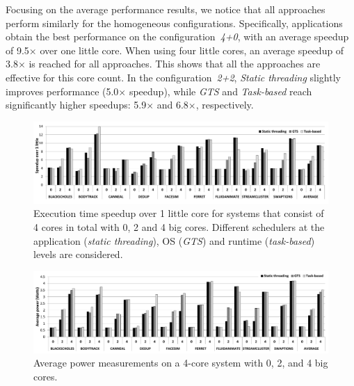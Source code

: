 Focusing on the average performance results, we notice that all approaches perform similarly for the homogeneous configurations. 
Specifically, applications obtain the best performance on the configuration~\emph{4+0}, with an average speedup of 9.5$\times$ over one little core. 
When using four little cores, an average speedup of 3.8$\times$ is reached for all approaches. 
This shows that all the approaches are effective for this core count. 
In the configuration~\emph{2+2}, \emph{Static threading} slightly improves performance (5.0$\times$ speedup), while \emph{GTS} and \emph{Task-based} reach significantly higher speedups: 5.9$\times$ and 6.8$\times$, respectively.
\begin{figure}[t]%
	\centering
	\includegraphics[width=1.0\textwidth]{figures/speedup-4_new.pdf}
	\vspace{-0.5cm}
	\caption{Execution time speedup over 1 little core for systems that consist of 4 cores in 
		total with 0, 2 and 4 big cores. Different schedulers at the application (\textit{static 
			threading}), OS  (\textit{GTS}) and runtime (\textit{task-based}) levels are considered.}
	\label{fig:speedup4}%
\end{figure}
\begin{figure}[t]%
	\centering
	\includegraphics[width=1.0\textwidth]{figures/power4_new.pdf}
	\vspace{-0.5cm}
	\caption{Average power measurements on a 4-core system with 0, 2, and 4 big cores.}
	\label{fig:power4}%
\end{figure}
